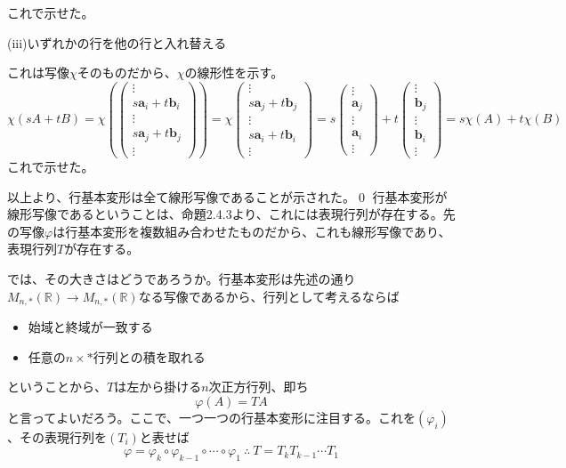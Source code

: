 \documentclass[dvipdfmx]{jsarticle}
\begin{document}
これで示せた。\\\par
(iii)いずれかの行を他の行と入れ替える\par
これは写像$\chi$そのものだから、$\chi$の線形性を示す。
\[\chi(sA+tB)=\chi(\begin{pmatrix}\vdots\\s\bm{a}_i+t\bm{b}_i\\\vdots\\s\bm{a}_j+t\bm{b}_j\\\vdots\end{pmatrix})=\chi\begin{pmatrix}\vdots\\s\bm{a}_j+t\bm{b}_j\\\vdots\\s\bm{a}_i+t\bm{b}_i\\\vdots\end{pmatrix}=s\begin{pmatrix}\vdots\\\bm{a}_j\\\vdots\\\bm{a}_i\\\vdots\end{pmatrix}+t\begin{pmatrix}\vdots\\\bm{b}_j\\\vdots\\\bm{b}_i\\\vdots\end{pmatrix}=s\chi(A)+t\chi(B)\]
これで示せた。\par
以上より、行基本変形は全て線形写像であることが示された。\qed\newpage
行基本変形が線形写像であるということは、命題2.4.3より、これには表現行列が存在する。先の写像$\varphi$は行基本変形を複数組み合わせたものだから、これも線形写像であり、表現行列$T$が存在する。\par
では、その大きさはどうであろうか。行基本変形は先述の通り$M_{n,\ast}(\mathbb{R}) \to M_{n,\ast}(\mathbb{R})$なる写像であるから、行列として考えるならば
\begin{itemize}
\item 始域と終域が一致する
\item 任意の$n \times \ast$行列との積を取れる
\end{itemize}
ということから、$T$は左から掛ける$n$次正方行列、即ち
\[\varphi(A)=TA\]
と言ってよいだろう。ここで、一つ一つの行基本変形に注目する。これを$(\varphi_i)$、その表現行列を$(T_i)$と表せば
\[\varphi=\varphi_k\circ\varphi_{k-1}\circ\cdots\circ\varphi_1~\therefore~T=T_kT_{k-1} \cdots T_1\]
\end{document}
